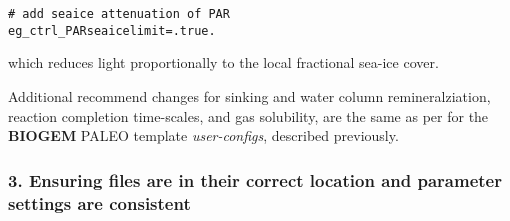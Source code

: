 \begin{itemize}[noitemsep]
\begin{enumerate}[noitemsep]
\small\vspace{-1mm}\begin{verbatim}
# add seaice attenuation of PAR
eg_ctrl_PARseaicelimit=.true.
\end{verbatim}\vspace{-1mm}\normalsize
which reduces light proportionally to the local fractional sea-ice cover.
\end{enumerate}
Additional recommend changes for sinking and water column remineralziation, reaction completion time-scales, and gas solubility, are the same as per for the \textbf{BIOGEM} PALEO template \textit{user-configs}, described previously.

\end{itemize}

%
\subsubsection{3. Ensuring files are in their correct location and parameter settings are consistent}

